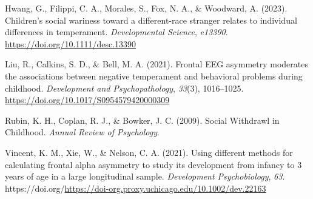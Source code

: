 \documentclass[
  man,
  floatsintext,
  longtable,
  nolmodern,
  notxfonts,
  notimes,
  colorlinks=true,linkcolor=blue,citecolor=blue,urlcolor=blue]{apa7}
\newlength{\cslhangindent}
\newenvironment{CSLReferences}[2] %
 {\begin{list}{}{%
  \setlength{\itemindent}{0pt}
  \setlength{\leftmargin}{0pt}
  \setlength{\parsep}{0pt}
  \ifodd #1
   \setlength{\leftmargin}{\cslhangindent}
   \setlength{\itemindent}{-1\cslhangindent}
  \fi
  \setlength{\itemsep}{#2\baselineskip}}}
 {\end{list}}
\begin{document}
\begin{CSLReferences}{1}{0}
Hwang, G., Filippi, C. A., Morales, S., Fox, N. A., \& Woodward, A.
(2023). Children's social wariness toward a different-race stranger
relates to individual differences in temperament. \emph{Developmental
Science}, \emph{e13390}. \url{https://doi.org/10.1111/desc.13390}

Liu, R., Calkins, S. D., \& Bell, M. A. (2021). Frontal {EEG} asymmetry
moderates the associations between negative temperament and behavioral
problems during childhood. \emph{Development and Psychopathology},
\emph{33}(3), 1016--1025.
\url{https://doi.org/10.1017/S0954579420000309}

Rubin, K. H., Coplan, R. J., \& Bowker, J. C. (2009). Social {Withdrawl}
in {Childhood}. \emph{Annual Review of Psychology}.

Vincent, K. M., Xie, W., \& Nelson, C. A. (2021). Using different
methods for calculating frontal alpha asymmetry to study its development
from infancy to 3 years of age in a large longitudinal sample.
\emph{Development Psychobiology}, \emph{63}.
https://doi.org/\url{https://doi-org.proxy.uchicago.edu/10.1002/dev.22163}

\end{CSLReferences}
\end{document}
